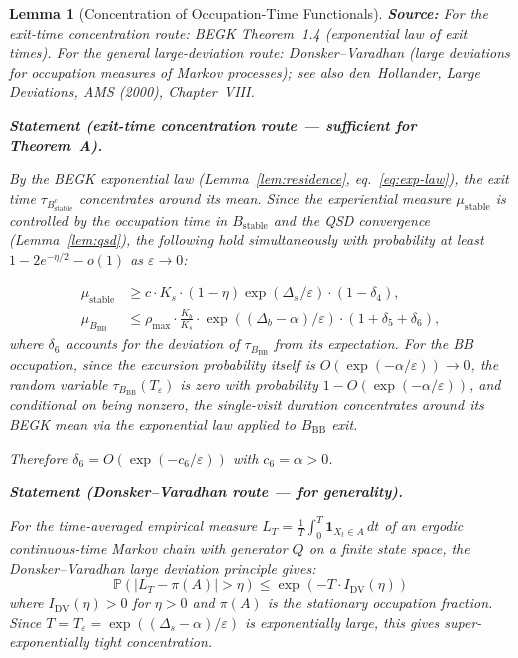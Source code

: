 \documentclass[11pt]{article}
\newtheorem{lemma}{Lemma}
\newcommand{\eps}{\varepsilon}
\newcommand{\Ds}{\Delta_s}
\newcommand{\Db}{\Delta_b}
\newcommand{\Bstable}{B_{\mathrm{stable}}}
\newcommand{\BBB}{B_{\mathrm{BB}}}
\newcommand{\Teps}{T_\eps}
\begin{document}
\begin{lemma}[Concentration of Occupation-Time Functionals]%
\label{lem:concentration}
\textbf{Source:} For the exit-time concentration route:
BEGK \cite{BEGK02} Theorem~1.4 (exponential law of exit times).
For the general large-deviation route:
Donsker--Varadhan \cite{DV75-83} (large deviations for occupation
measures of Markov processes); see also den~Hollander,
\emph{Large Deviations}, AMS (2000), Chapter~VIII.

\medskip
\textbf{Statement (exit-time concentration route --- sufficient for
Theorem~A).}

By the BEGK exponential law (Lemma~\ref{lem:residence},
eq.~\eqref{eq:exp-law}), the exit time $\tau_{\Bstable^c}$
concentrates around its mean. Since the experiential measure
$\mu_{\mathrm{stable}}$ is controlled by the occupation time in
$\Bstable$ and the QSD convergence (Lemma~\ref{lem:qsd}), the
following hold simultaneously with probability at least
$1 - 2e^{-\eta/2} - o(1)$ as $\eps \to 0$:

\begin{align}
  \mu_{\mathrm{stable}}
  &\geq c \cdot K_s \cdot (1-\eta) \exp(\Ds/\eps)
    \cdot (1 - \delta_4),
    \label{eq:conc-stable} \\
  \mu_\BBB
  &\leq \rho_{\max} \cdot \frac{K_b}{K_s}
    \cdot \exp((\Db - \alpha)/\eps)
    \cdot (1 + \delta_5 + \delta_6),
    \label{eq:conc-bb}
\end{align}
where $\delta_6$ accounts for the deviation of $\tau_\BBB$ from its
expectation. For the BB occupation, since the excursion probability
itself is $O(\exp(-\alpha/\eps)) \to 0$, the random variable
$\tau_\BBB(\Teps)$ is zero with probability
$1 - O(\exp(-\alpha/\eps))$, and conditional on being nonzero,
the single-visit duration concentrates around its BEGK mean via
the exponential law applied to $\BBB$ exit.

Therefore $\delta_6 = O(\exp(-c_6/\eps))$ with
$c_6 = \alpha > 0$.

\medskip
\textbf{Statement (Donsker--Varadhan route --- for generality).}

For the time-averaged empirical measure
$L_T = \frac{1}{T}\int_0^T \mathbf{1}_{X_t \in A}\, dt$
of an ergodic continuous-time Markov chain with generator $Q$ on
a finite state space, the Donsker--Varadhan large deviation principle
gives:
\[
  \mathbb{P}(|L_T - \pi(A)| > \eta)
  \leq \exp(-T \cdot I_{\mathrm{DV}}(\eta))
\]
where $I_{\mathrm{DV}}(\eta) > 0$ for $\eta > 0$ and $\pi(A)$ is
the stationary occupation fraction. Since
$T = \Teps = \exp((\Ds - \alpha)/\eps)$ is exponentially large,
this gives super-exponentially tight concentration.


\end{lemma}
\end{document}
